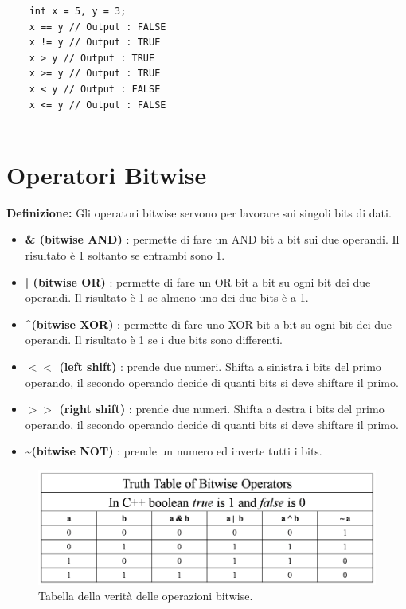 \begin{lstlisting}
	int x = 5, y = 3;
	x == y // Output : FALSE
	x != y // Output : TRUE
	x > y // Output : TRUE
	x >= y // Output : TRUE
	x < y // Output : FALSE
	x <= y // Output : FALSE
	
\end{lstlisting}


\section{Operatori Bitwise}

\textsf{\small \textbf{Definizione: } Gli operatori bitwise servono per lavorare sui singoli bits di dati.} \\

\begin{itemize}
	\item \textsf{\small \textbf{\& (bitwise AND)} : permette di fare un AND bit a bit sui due operandi. Il risultato è 1 soltanto se entrambi sono 1.}
	\item \textsf{\small \textbf{| (bitwise OR)} : permette di fare un OR bit a bit su ogni bit dei due operandi. Il risultato è 1 se almeno uno dei due bits è a 1.}
	\item \textsf{\small \textbf{\textasciicircum  (bitwise XOR)} : permette di fare uno XOR bit a bit su ogni bit dei due operandi. Il risultato è 1 se i due bits sono differenti.}
	\item \textsf{\small \textbf{$<<$ (left shift)} : prende due numeri. Shifta a sinistra i bits del primo operando, il secondo operando decide di quanti bits si deve shiftare il primo.}
	\item \textsf{\small \textbf{$>>$ (right shift)} : prende due numeri. Shifta a destra i bits del primo operando, il secondo operando decide di quanti bits si deve shiftare il primo.}
	\item \textsf{\small \textbf{\textasciitilde (bitwise NOT)} : prende un numero ed inverte tutti i bits.}
\end{itemize}

\begin{figure}[H]
	\centering
	\includegraphics[width=1\textwidth, height=1\textheight, keepaspectratio]{./imgs/bitwise_operators_truth_table.png}
	\caption{Tabella della verità delle operazioni bitwise.}
	\label{fig:bitwise_operators_truth_table}
\end{figure}

